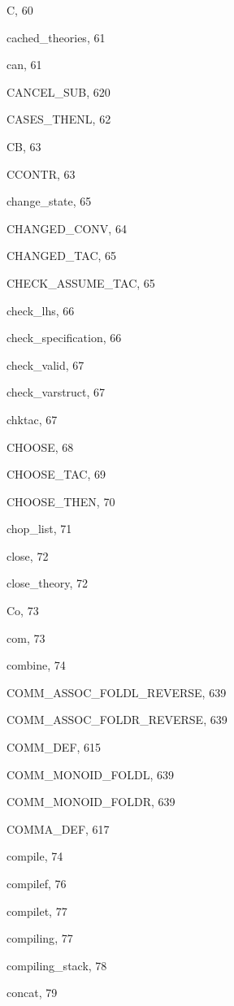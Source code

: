 \begin{theindex}
  \item {\ptt C}, 60
  \item {\ptt cached\_theories}, 61
  \item {\ptt can}, 61
  \item {\ptt CANCEL\_SUB}, 620
  \item {\ptt CASES\_THENL}, 62
  \item {\ptt CB}, 63
  \item {\ptt CCONTR}, 63
  \item {\ptt change\_state}, 65
  \item {\ptt CHANGED\_CONV}, 64
  \item {\ptt CHANGED\_TAC}, 65
  \item {\ptt CHECK\_ASSUME\_TAC}, 65
  \item {\ptt check\_lhs}, 66
  \item {\ptt check\_specification}, 66
  \item {\ptt check\_valid}, 67
  \item {\ptt check\_varstruct}, 67
  \item {\ptt chktac}, 67
  \item {\ptt CHOOSE}, 68
  \item {\ptt CHOOSE\_TAC}, 69
  \item {\ptt CHOOSE\_THEN}, 70
  \item {\ptt chop\_list}, 71
  \item {\ptt close}, 72
  \item {\ptt close\_theory}, 72
  \item {\ptt Co}, 73
  \item {\ptt com}, 73
  \item {\ptt combine}, 74
  \item {\ptt COMM\_ASSOC\_FOLDL\_REVERSE}, 639
  \item {\ptt COMM\_ASSOC\_FOLDR\_REVERSE}, 639
  \item {\ptt COMM\_DEF}, 615
  \item {\ptt COMM\_MONOID\_FOLDL}, 639
  \item {\ptt COMM\_MONOID\_FOLDR}, 639
  \item {\ptt COMMA\_DEF}, 617
  \item {\ptt compile}, 74
  \item {\ptt compilef}, 76
  \item {\ptt compilet}, 77
  \item {\ptt compiling}, 77
  \item {\ptt compiling\_stack}, 78
  \item {\ptt concat}, 79

\end{theindex}
